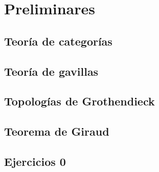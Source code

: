 \chapter{Preliminares}
\label{chap:0}

\section{Teoría de categorías}
\label{sec:0.1}

\section{Teoría de gavillas}
\label{sec:0.2}

\section{Topologías de Grothendieck}
\label{sec:0.3}

\section{Teorema de Giraud}
\label{sec:0.4}

\section*{Ejercicios 0}
\label{sec:ejercicios-0}
